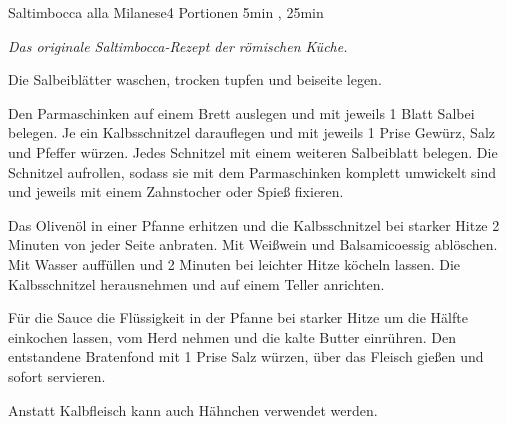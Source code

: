 \documentclass[../recipe-collections/cooking.tex]{subfiles}
\begin{document}
\begin{recipe}{Saltimbocca alla Milanese}{4 Portionen }{5min , 25min }

  \freeform{}\textit{Das originale Saltimbocca-Rezept der römischen Küche.}


  Die Salbeiblätter waschen, trocken tupfen und beiseite legen.


  Den Parmaschinken auf einem Brett auslegen und mit jeweils 1 Blatt Salbei belegen.
  Je ein Kalbsschnitzel darauflegen und mit jeweils 1 Prise Gewürz, Salz und Pfeffer würzen.
  Jedes Schnitzel mit einem weiteren Salbeiblatt belegen.
  Die Schnitzel aufrollen, sodass sie mit dem Parmaschinken komplett umwickelt sind und jeweils mit einem Zahnstocher oder Spieß fixieren.


  Das Olivenöl in einer Pfanne erhitzen und die Kalbsschnitzel bei starker Hitze 2 Minuten von jeder Seite anbraten.
  Mit Weißwein und Balsamicoessig ablöschen.
  Mit Wasser auffüllen und 2 Minuten bei leichter Hitze köcheln lassen.
  Die Kalbsschnitzel herausnehmen und auf einem Teller anrichten.


  Für die Sauce die Flüssigkeit in der Pfanne bei starker Hitze um die Hälfte einkochen lassen, vom Herd nehmen und die kalte Butter einrühren.
  Den entstandene Bratenfond mit 1 Prise Salz würzen, über das Fleisch gießen und sofort servieren.

  \freeform{}\hrulefill{}

  \freeform{}
  Anstatt Kalbfleisch kann auch Hähnchen verwendet werden.

\end{recipe}
\end{document}

